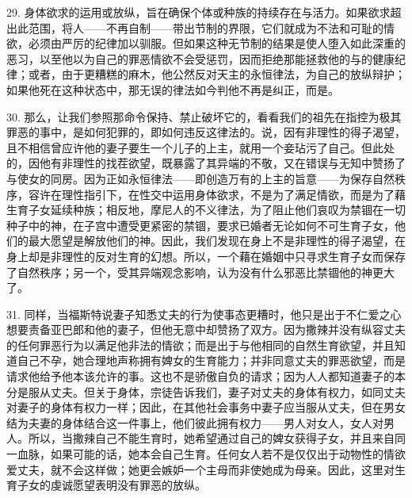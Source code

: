 29. 身体欲求的运用或放纵，旨在确保个体或种族的持续存在与活力。如果欲求超出此范围，将人——不再自制——带出节制的界限，它们就成为不法和可耻的情欲，必须由严厉的纪律加以驯服。但如果这种无节制的结果是使人堕入如此深重的恶习，以至他以为自己的罪恶情欲不会受惩罚，因而拒绝那能拯救他的与的健康纪律；或者，由于更糟糕的麻木，他公然反对天主的永恒律法，为自己的放纵辩护；如果他死在这种状态中，那无误的律法如今判他不再是纠正，而是。\par

30. 那么，让我们参照那命令保持、禁止破坏它的，看看我们的祖先在指控为极其罪恶的事中，是如何犯罪的，即如何违反这律法的。说，因有非理性的得子渴望，且不相信曾应许他的妻子要生一个儿子的上主，就用一个妾玷污了自己。但此处的，因他有非理性的找茬欲望，既暴露了其异端的不敬，又在错误与无知中赞扬了与使女的同房。因为正如永恒律法——即创造万有的上主的旨意——为保存自然秩序，容许在理性指引下，在性交中运用身体欲求，不是为了满足情欲，而是为了藉生育子女延续种族；相反地，摩尼人的不义律法，为了阻止他们哀叹为禁锢在一切种子中的神，在子宫中遭受更紧密的禁锢，要求已婚者无论如何不可生育子女，他们的最大愿望是解放他们的神。因此，我们发现在身上不是非理性的得子渴望，在身上却是非理性的反对生育的幻想。所以，一个藉在婚姻中只寻求生育子女而保存了自然秩序；另一个，受其异端观念影响，认为没有什么邪恶比禁锢他的神更大了。\par

31. 同样，当福斯特说妻子知悉丈夫的行为使事态更糟时，他只是出于不仁爱之心想要责备亚巴郎和他的妻子，但他无意中却赞扬了双方。因为撒辣并没有纵容丈夫的任何罪恶行为以满足他非法的情欲；而是出于与他相同的自然生育欲望，并且知道自己不孕，她合理地声称拥有婢女的生育能力；并非同意丈夫的罪恶欲望，而是请求他给予他本该允许的事。这也不是骄傲自负的请求；因为人人都知道妻子的本分是服从丈夫。但关于身体，宗徒告诉我们，妻子对丈夫的身体有权力，如同丈夫对妻子的身体有权力一样；因此，在其他社会事务中妻子应当服从丈夫，但在男女结为夫妻的身体结合这一件事上，他们彼此拥有权力——男人对女人，女人对男人。所以，当撒辣自己不能生育时，她希望通过自己的婢女获得子女，并且来自同一血脉，如果可能的话，她本会自己生育。任何女人若不是仅仅出于动物性的情欲爱丈夫，就不会这样做；她更会嫉妒一个主母而非使她成为母亲。因此，这里对生育子女的虔诚愿望表明没有罪恶的放纵。\par

